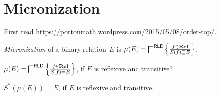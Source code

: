 \chapter{Micronization}

First read \url{https://portonmath.wordpress.com/2015/05/08/order-top/}.

\begin{defn}
\emph{Micronization} of a binary relation~$E$ is
$\mu(E) = \bigsqcap^{\mathsf{RLD}} \left\{ \frac{f\in\mathbf{Rel}}{S(f)\sqsupseteq E}\right\}$.
\end{defn}

\begin{question}
$\mu(E) = \bigsqcap^{\mathsf{RLD}} \left\{ \frac{f\in\mathbf{Rel}}{S(f)=E}\right\}$, if $E$ is reflexive and transitive?
\end{question}

\begin{conjecture}
$S^{\ast}(\mu(E)) = E$, if $E$ is reflexive and transitive.
\end{conjecture}
